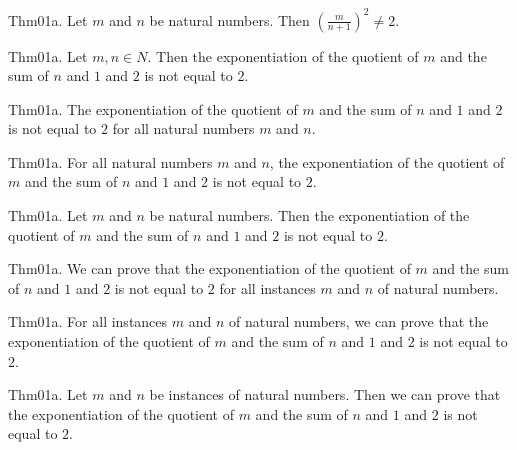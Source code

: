 \documentclass{article}
\begin{document}
Thm01a. Let $m$ and $n$ be natural numbers. Then $(\frac{ m}{n + 1})^ {2}\neq 2$.

Thm01a. Let $m , n \in N$. Then the exponentiation of the quotient of $m$ and the sum of $n$ and $1$ and $2$ is not equal to $2$.

Thm01a. The exponentiation of the quotient of $m$ and the sum of $n$ and $1$ and $2$ is not equal to $2$ for all natural numbers $m$ and $n$.

Thm01a. For all natural numbers $m$ and $n$, the exponentiation of the quotient of $m$ and the sum of $n$ and $1$ and $2$ is not equal to $2$.

Thm01a. Let $m$ and $n$ be natural numbers. Then the exponentiation of the quotient of $m$ and the sum of $n$ and $1$ and $2$ is not equal to $2$.

Thm01a. We can prove that the exponentiation of the quotient of $m$ and the sum of $n$ and $1$ and $2$ is not equal to $2$ for all instances $m$ and $n$ of natural numbers.

Thm01a. For all instances $m$ and $n$ of natural numbers, we can prove that the exponentiation of the quotient of $m$ and the sum of $n$ and $1$ and $2$ is not equal to $2$.

Thm01a. Let $m$ and $n$ be instances of natural numbers. Then we can prove that the exponentiation of the quotient of $m$ and the sum of $n$ and $1$ and $2$ is not equal to $2$.
\end{document}
